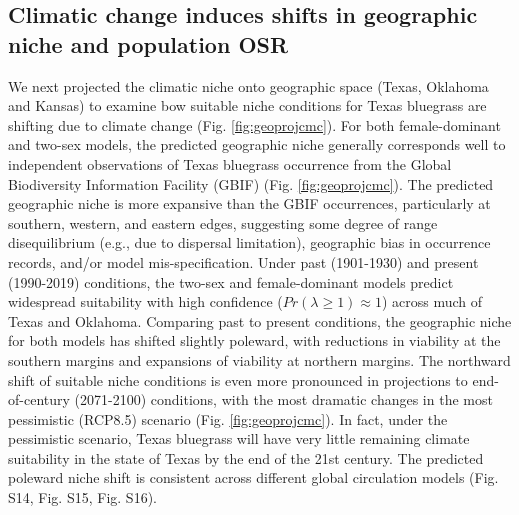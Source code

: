 \documentclass[9pt,twocolumn,twoside,lineno]{pnas-new}
\begin{document}
\subsection*{Climatic change induces shifts in geographic niche and population OSR}
We next projected the climatic niche onto geographic space (Texas, Oklahoma and Kansas) to examine bow suitable niche conditions for Texas bluegrass are shifting due to climate change (Fig. \ref{fig:geoprojcmc}). 
For both female-dominant and two-sex models, the predicted geographic niche generally corresponds well to independent observations of Texas bluegrass occurrence from the Global Biodiversity Information Facility (GBIF) (Fig. \ref{fig:geoprojcmc}).
The predicted geographic niche is more expansive than the GBIF occurrences, particularly at southern, western, and eastern edges, suggesting some degree of range disequilibrium (e.g., due to dispersal limitation), geographic bias in occurrence records, and/or model mis-specification. 
Under past (1901-1930) and present (1990-2019) conditions, the two-sex and female-dominant models predict widespread suitability with high confidence ($Pr(\lambda  \ge 1) \approx 1$) across much of Texas and Oklahoma. 
Comparing past to present conditions, the geographic niche for both models has shifted slightly poleward, with reductions in viability at the southern margins and expansions of viability at northern margins. 
The northward shift of suitable niche conditions is even more pronounced in projections to end-of-century (2071-2100) conditions, with the most dramatic changes in the most pessimistic (RCP8.5) scenario (Fig. \ref{fig:geoprojcmc}). 
In fact, under the pessimistic scenario, Texas bluegrass will have very little remaining climate suitability in the state of Texas by the end of the 21st century. 
The predicted poleward niche shift is consistent across different global circulation models (Fig. S14, Fig. S15, Fig. S16). 
\end{document}
